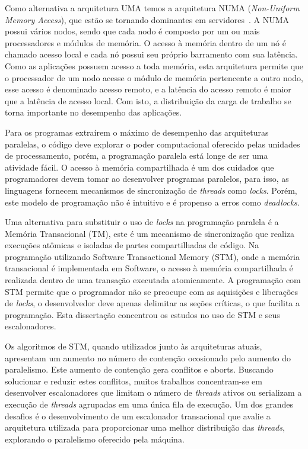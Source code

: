 \documentclass[diss,capa]{texufpel}
\begin{document}
Como alternativa a arquitetura UMA temos a arquitetura NUMA (\emph{Non-Uniform Memory Access}), que estão se tornando dominantes em servidores~\cite{Calciu:2017}. A NUMA possui vários nodos, sendo que cada nodo é composto por um ou mais processadores e módulos de memória. O acesso à memória dentro de um nó é chamado acesso local e cada nó possui seu próprio barramento com sua latência. Como as aplicações possuem acesso a toda memória, esta arquitetura permite que o processador de um nodo acesse o módulo de memória pertencente a outro nodo, esse acesso é denominado acesso remoto, e a latência do acesso remoto é maior que a latência de acesso local. Com isto, a distribuição da carga de trabalho se torna importante no desempenho das aplicações.

Para os programas extraírem o máximo de desempenho das arquiteturas paralelas, o código deve explorar o poder computacional oferecido pelas unidades de processamento, porém, a programação paralela está longe de ser uma atividade fácil. O acesso à memória compartilhada é um dos cuidados que programadores devem tomar ao desenvolver programas paralelos, para isso, as linguagens fornecem mecanismos de sincronização de \emph{threads} como \emph{locks}. Porém, este modelo de programação não é intuitivo e é propenso a erros como \emph{deadlocks}.

Uma alternativa para substituir o uso de \emph{locks} na programação paralela é a Memória Transacional (TM), este é um mecanismo de sincronização que realiza execuções atômicas e isoladas de partes compartilhadas de código. Na programação utilizando Software Transactional Memory (STM), onde a memória transacional é implementada em Software, o acesso à memória compartilhada é realizada dentro de uma transação executada atomicamente. A programação com STM permite que o programador não se preocupe com as aquisições e liberações de \emph{locks}, o desenvolvedor deve apenas delimitar as seções críticas, o que facilita a programação. Esta dissertação concentrou os estudos no uso de STM e seus escalonadores.

Os algoritmos de STM, quando utilizados junto às arquiteturas atuais, apresentam um aumento no número de contenção ocosionado pelo aumento do paralelismo. Este aumento de contenção gera conflitos e aborts. Buscando solucionar e reduzir estes conflitos, muitos trabalhos concentram-se em desenvolver escalonadores que limitam o número de \emph{threads} ativos ou serializam a execução de \emph{threads} agrupadas em uma única fila de execução. Um dos grandes desafios é o desenvolvimento de um escalonador transacional que avalie a arquitetura utilizada para proporcionar uma melhor distribuição das \emph{threads}, explorando o paralelismo oferecido pela máquina.
\end{document}
